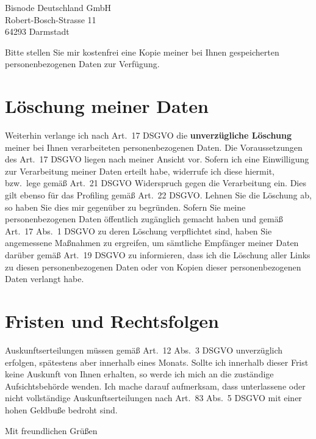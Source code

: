 \documentclass[a4paper,DIV=11]{scrartcl}
\begin{document}
\begin{letter}{%

Bisnode Deutschland GmbH\\
Robert-Bosch-Strasse 11\\
64293 Darmstadt
}
Bitte stellen Sie mir kostenfrei eine Kopie meiner bei Ihnen gespeicherten personenbezogenen Daten zur Verfügung.

\section{Löschung meiner Daten}

Weiterhin verlange ich nach Art.\ 17 DSGVO die \textbf{unverzügliche Löschung} meiner bei Ihnen verarbeiteten personenbezogenen Daten.
Die Voraussetzungen des Art.\ 17 DSGVO liegen nach meiner Ansicht vor. Sofern ich eine Einwilligung zur Verarbeitung meiner Daten erteilt habe, widerrufe ich diese hiermit, bzw.\ lege gemäß Art.\ 21 DSGVO Widerspruch gegen die Verarbeitung ein. Dies gilt ebenso für das Profiling gemäß Art.\ 22 DSGVO. Lehnen Sie die Löschung ab, so haben Sie dies mir gegenüber zu begründen.
Sofern Sie meine personenbezogenen Daten öffentlich zugänglich gemacht haben und gemäß Art.\ 17 Abs.\ 1 DSGVO zu deren Löschung verpflichtet sind, haben Sie angemessene Maßnahmen zu ergreifen, um sämtliche Empfänger meiner Daten darüber gemäß Art.\ 19 DSGVO zu informieren, dass ich die Löschung aller Links zu diesen personenbezogenen Daten oder von Kopien dieser personenbezogenen Daten verlangt habe.


\section{Fristen und Rechtsfolgen}

Auskunftserteilungen müssen gemäß Art.\ 12 Abs.\ 3 DSGVO unverzüglich erfolgen, spätestens aber innerhalb eines Monats. Sollte ich innerhalb dieser Frist keine Auskunft von Ihnen erhalten, so werde ich mich an die zuständige Aufsichtsbehörde wenden. Ich mache darauf aufmerksam, dass unterlassene oder nicht vollständige Auskunftserteilungen nach Art.\ 83 Abs.\ 5 DSGVO mit einer hohen Geldbuße bedroht sind.


\closing{Mit freundlichen Grüßen}

\end{letter}
\end{document}
